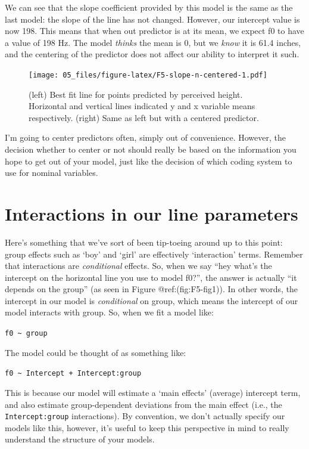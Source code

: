 \documentclass[
]{book}
\begin{document}
We can see that the slope coefficient provided by this model is the same as the last model: the slope of the line has not changed. However, our intercept value is now 198. This means that when out predictor is at its mean, we expect f0 to have a value of 198 Hz. The model \emph{thinks} the mean is 0, but we \emph{know} it is 61.4 inches, and the centering of the predictor does not affect our ability to interpret it such.

\begin{figure}
\centering
\texttt{[image: 05\_files/figure-latex/F5-slope-n-centered-1.pdf]}
\caption{\label{fig:F5-slope-n-centered}(left) Best fit line for points predicted by perceived height. Horizontal and vertical lines indicated y and x variable means respectively. (right) Same as left but with a centered predictor.}
\end{figure}

I'm going to center predictors often, simply out of convenience. However, the decision whether to center or not should really be based on the information you hope to get out of your model, just like the decision of which coding system to use for nominal variables.

\hypertarget{interactions-in-our-line-parameters}{%
\section{Interactions in our line parameters}\label{interactions-in-our-line-parameters}}

Here's something that we've sort of been tip-toeing around up to this point: group effects such as `boy' and `girl' are effectively `interaction' terms. Remember that interactions are \emph{conditional} effects. So, when we say ``hey what's the intercept on the horizontal line you use to model f0?'', the answer is actually ``it depends on the group'' (as seen in Figure @ref:(fig:F5-fig1)). In other words, the intercept in our model is \emph{conditional} on group, which means the intercept of our model interacts with group. So, when we fit a model like:

\texttt{f0\ \textasciitilde{}\ group}

The model could be thought of as something like:

\texttt{f0\ \textasciitilde{}\ Intercept\ +\ Intercept:group}

This is because our model will estimate a `main effects' (average) intercept term, and also estimate group-dependent deviations from the main effect (i.e., the \texttt{Intercept:group} interactions). By convention, we don't actually specify our models like this, however, it's useful to keep this perspective in mind to really understand the structure of your models.
\end{document}
